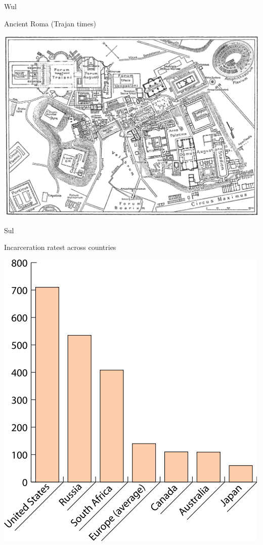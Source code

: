 \documentclass[print,Draft]{faosyb}
\begin{document}
\begin{map}{W}{ul}
\caption{Ancient Roma \newline (Trajan times)}
\label{map:roma}
\includegraphics[width=\chartwidth,height=\chartheight]{Rome}
\end{map}

\lipsum[1-15]

\begin{chart}{S}{ul}
\caption{Incarceration ratest across countries}
\label{chart:incarceration}
\includegraphics[width=\chartwidth,height=\chartheight]{incarceration}  
\end{chart}
\end{document}

